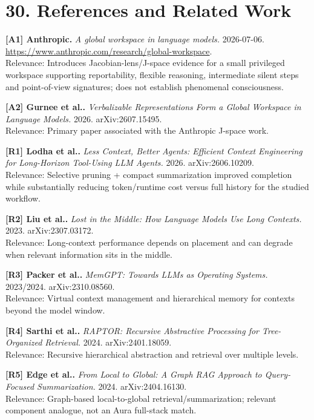 \documentclass[
  10pt,
  letterpaper,
]{article}
\begin{document}
\section{30. References and Related
Work}\label{30-references-and-related-work}

\textbf{{[}A1{]} Anthropic.} \emph{A global workspace in language
models.} 2026-07-06.
\url{https://www.anthropic.com/research/global-workspace}.\\
Relevance: Introduces Jacobian-lens/J-space evidence for a small
privileged workspace supporting reportability, flexible reasoning,
intermediate silent steps and point-of-view signatures; does not
establish phenomenal consciousness.

\textbf{{[}A2{]} Gurnee et al..} \emph{Verbalizable Representations Form
a Global Workspace in Language Models.} 2026. arXiv:2607.15495.\\
Relevance: Primary paper associated with the Anthropic J-space work.

\textbf{{[}R1{]} Lodha et al..} \emph{Less Context, Better Agents:
Efficient Context Engineering for Long-Horizon Tool-Using LLM Agents.}
2026. arXiv:2606.10209.\\
Relevance: Selective pruning + compact summarization improved completion
while substantially reducing token/runtime cost versus full history for
the studied workflow.

\textbf{{[}R2{]} Liu et al..} \emph{Lost in the Middle: How Language
Models Use Long Contexts.} 2023. arXiv:2307.03172.\\
Relevance: Long-context performance depends on placement and can degrade
when relevant information sits in the middle.

\textbf{{[}R3{]} Packer et al..} \emph{MemGPT: Towards LLMs as Operating
Systems.} 2023/2024. arXiv:2310.08560.\\
Relevance: Virtual context management and hierarchical memory for
contexts beyond the model window.

\textbf{{[}R4{]} Sarthi et al..} \emph{RAPTOR: Recursive Abstractive
Processing for Tree-Organized Retrieval.} 2024. arXiv:2401.18059.\\
Relevance: Recursive hierarchical abstraction and retrieval over
multiple levels.

\textbf{{[}R5{]} Edge et al..} \emph{From Local to Global: A Graph RAG
Approach to Query-Focused Summarization.} 2024. arXiv:2404.16130.\\
Relevance: Graph-based local-to-global retrieval/summarization; relevant
component analogue, not an Aura full-stack match.
\end{document}
